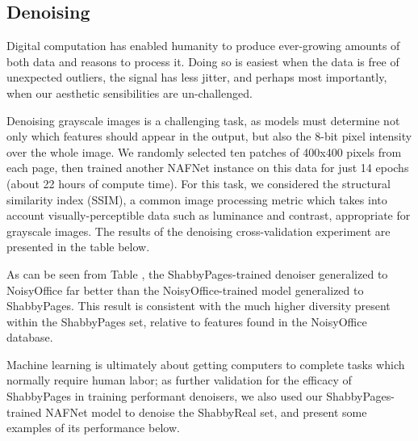 \documentclass[runningheads]{llncs}
\begin{document}
\subsection{Denoising}
Digital computation has enabled humanity to produce ever-growing amounts of both data and reasons to process it.
Doing so is easiest when the data is free of unexpected outliers, the signal has less jitter, and perhaps most importantly, when our aesthetic sensibilities are un-challenged.

Denoising grayscale images is a challenging task, as models must determine not only which features should appear in the output, but also the 8-bit pixel intensity over the whole image.
We randomly selected ten patches of 400x400 pixels from each page, then trained another NAFNet instance on this data for just 14 epochs (about 22 hours of compute time).
For this task, we considered the structural similarity index (SSIM), a common image processing metric which takes into account visually-perceptible data such as luminance and contrast, appropriate for grayscale images.
The results of the denoising cross-validation experiment are presented in the table below.

\begin{table}[]
    \centering
    \caption{Document image denoising cross-test performance of NAFNet models trained on ShabbyPages and NoisyOffice.}
    \label{tab:denoising_results}
\end{table}

As can be seen from Table \cite{tab:denoising_results}, the ShabbyPages-trained denoiser generalized to NoisyOffice far better than the NoisyOffice-trained model generalized to ShabbyPages. This result is consistent with the much higher diversity present within the ShabbyPages set, relative to features found in the NoisyOffice database.

Machine learning is ultimately about getting computers to complete tasks which normally require human labor; as further validation for the efficacy of ShabbyPages in training performant denoisers, we also used our ShabbyPages-trained NAFNet model to denoise the ShabbyReal set, and present some examples of its performance below.
\end{document}
